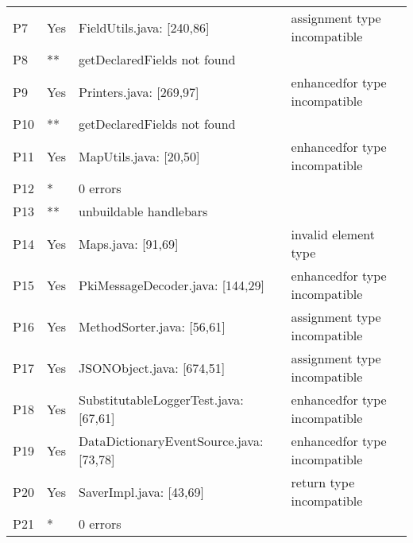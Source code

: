 \begin{table}[]
\begin{tabular}{|p{1.5cm}|p{1cm}|p{4cm}|p{5cm}|}
        P7 & Yes & FieldUtils.java: [240,86] & assignment type incompatible  \\
        P8 & ** & getDeclaredFields not found &   \\
        P9 & Yes & Printers.java: [269,97]  &  enhancedfor type incompatible \\
        P10 & ** & getDeclaredFields not found  &  \\
        P11 & Yes & MapUtils.java: [20,50]   & enhancedfor type incompatible  \\
        P12 & *  & 0 errors &  \\
        P13 & ** & unbuildable handlebars &  \\
        P14 & Yes  & Maps.java: [91,69] & invalid element type   \\
        P15 & Yes & PkiMessageDecoder.java: [144,29]  &  enhancedfor type incompatible  \\
        P16 & Yes & MethodSorter.java: [56,61]  & assignment type incompatible  \\
        P17 & Yes & JSONObject.java: [674,51]  & assignment type incompatible  \\
        P18 & Yes & SubstitutableLoggerTest.java: [67,61]   & enhancedfor type incompatible  \\
        P19 & Yes & DataDictionaryEventSource.java: [73,78]  &  enhancedfor type incompatible  \\
        P20 & Yes & SaverImpl.java: [43,69]  &  return type incompatible  \\
        P21 & * & 0 errors &   \\ \hline
    \end{tabular}
\end{table}

